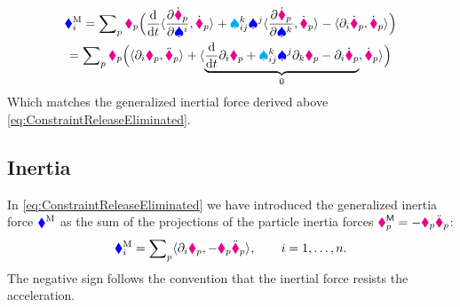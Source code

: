 \begin{multline}\label{eq:ResHamiltonPrinciple2}
 \genForceInertiaCoeff{\LidxI} = \sumParticles \particleMass{\PidxI} \Big(
 \diff{t} \sProd{\pdiff[\particlePosd{\PidxI}]{\sysVelCoeff{\LidxI}}}{\particlePosd{\PidxI}}
 + \BoltzSym{\LidxIII}{\LidxI}{\LidxII} \sysVelCoeff{\LidxII} \sProd{\pdiff[\particlePosd{\PidxI}]{\sysVelCoeff{\LidxIII}}}{\particlePosd{\PidxI}}
 - \sProd{\dirDiff{\LidxI} \particlePosd{\PidxI}}{\particlePosd{\PidxI}} \Big)
\\
 = \sumParticles \particleMass{\PidxI} \Big(
 \sProd{\dirDiff{\LidxI} \particlePos{\PidxI}}{\particlePosdd{\PidxI}}
 + \sProd{\underbrace{\diff{t} \dirDiff{\LidxI} \particlePos{\PidxI} + \BoltzSym{\LidxIII}{\LidxI}{\LidxII} \sysVelCoeff{\LidxII} \dirDiff{\LidxIII} \particlePos{\PidxI} - \dirDiff{\LidxI} \particlePosd{\PidxI}}_{0}}{\particlePosd{\PidxI}} \Big)
\end{multline}
Which matches the generalized inertial force derived above \eqref{eq:ConstraintReleaseEliminated}.



\subsection{Inertia}
In \eqref{eq:ConstraintReleaseEliminated} we have introduced the generalized inertia force $\genForceInertia$ as the sum of the projections of the particle inertia forces $\particleForceInertia{\PidxI} = -\particleMass{\PidxI} \particlePosdd{\PidxI}$:
\begin{align}
 \genForceInertiaCoeff{\LidxI} = \sumParticles \sProd{\dirDiff{\LidxI} \particlePos{\PidxI}}{-\particleMass{\PidxI} \particlePosdd{\PidxI}},
 \qquad
 \LidxI = 1,\ldots,\dimConfigSpace.
\end{align}
The negative sign follows the convention that the inertial force resists the acceleration.

